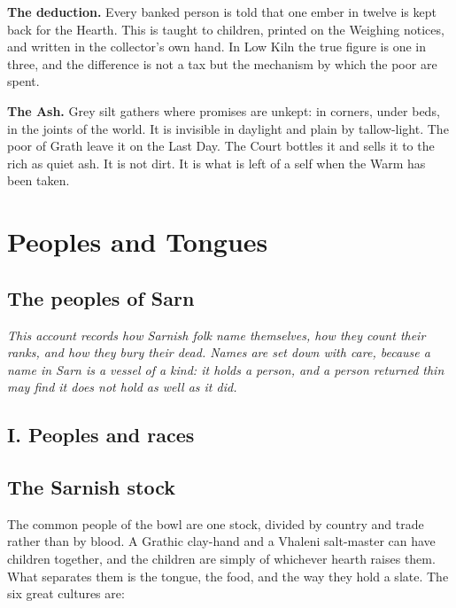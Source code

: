 \documentclass{design/chronicle}
\begin{document}
\textbf{The deduction.} Every banked person is told that one ember in twelve is kept back for the Hearth. This is taught to children, printed on the Weighing notices, and written in the collector’s own hand. In Low Kiln the true figure is one in three, and the difference is not a tax but the mechanism by which the poor are spent.

\textbf{The Ash.} Grey silt gathers where promises are unkept: in corners, under beds, in the joints of the world. It is invisible in daylight and plain by tallow-light. The poor of Grath leave it on the Last Day. The Court bottles it and sells it to the rich as quiet ash. It is not dirt. It is what is left of a self when the Warm has been taken.

\chapter*{Peoples and Tongues}
\section*{The peoples of Sarn}

\emph{This account records how Sarnish folk name themselves, how they count their ranks, and how they bury their dead. Names are set down with care, because a name in Sarn is a vessel of a kind: it holds a person, and a person returned thin may find it does not hold as well as it did.}

\CRrule

\section*{I. Peoples and races}

\section*{The Sarnish stock}

The common people of the bowl are one stock, divided by country and trade rather than by blood. A Grathic clay-hand and a Vhaleni salt-master can have children together, and the children are simply of whichever hearth raises them. What separates them is the tongue, the food, and the way they hold a slate. The six great cultures are:
\end{document}

